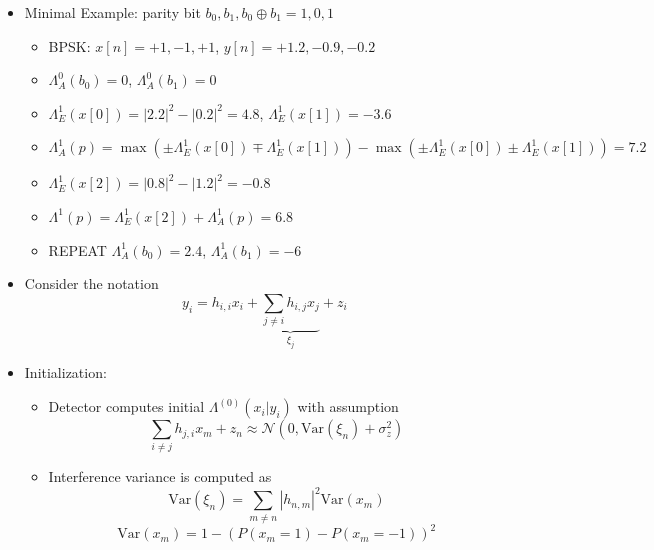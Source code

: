 \documentclass[xcolor=dvipsnames,aspectratio=169]{beamer}
\begin{document}
{\begin{itemize}
     
     \item Minimal Example: parity bit $b_0,b_1,b_0\oplus b_1 = 1,0,1$
     \begin{figure}
     \end{figure}
     \begin{itemize}
        \item BPSK: $x[n]=+1,-1,+1$, $y[n]=+1.2,-0.9,-0.2$
        \item $\Lambda_{A}^{0}(b_0)=0$, $\Lambda_{A}^{0}(b_1)=0$
        \item $\Lambda_{E}^{1}(x[0])=|2.2|^2-|0.2|^2=4.8$, $\Lambda_{E}^{1}(x[1])=-3.6$
        \item $\Lambda_{A}^{1}(p) = \max(\pm\Lambda_{E}^{1}(x[0])\mp\Lambda_{E}^{1}(x[1])) - \max(\pm\Lambda_{E}^{1}(x[0])\pm\Lambda_{E}^{1}(x[1]))=7.2$
        \item $\Lambda_{E}^{1}(x[2]) = |0.8|^2-|1.2|^2=-0.8$
        \item $\Lambda^{1}(p) = \Lambda_{E}^{1}(x[2])+\Lambda_{A}^{1}(p)=6.8$
        \item REPEAT $\Lambda_{A}^{1}(b_0)=2.4$, $\Lambda_{A}^{1}(b_1)=-6$
    \end{itemize}
    
          
          \pagebreak
          \item Consider the notation
          $$y_i=h_{i,i}x_{i}+\underset{\xi_j}{\underbrace{\sum_{j\neq i}h_{i,j}x_{j}}}+z_i$$
          \item Initialization:          
            \begin{itemize}
             \item Detector computes initial $\Lambda^{(0)}(x_i|y_i)$ with assumption 
          $$\sum_{i\neq j}h_{j,i}x_{m}+z_n\approx\mathcal{N}(0,\mathrm{Var}(\xi_n)+\sigma^2_z)$$
            \item Interference variance is computed as
                $$\mathrm{Var}(\xi_n)=\sum_{m\neq n}|h_{n,m}|^2\mathrm{Var}(x_{m})$$          
                $$\mathrm{Var}(x_{m})=1-(P(x_m=1)-P(x_m=-1))^2$$
            \end{itemize}
            \pagebreak
            

\end{itemize}}
\end{document}
